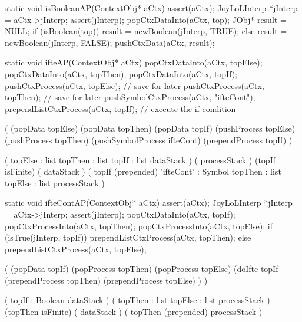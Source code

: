 \startCCode
static void isBooleanAP(ContextObj* aCtx) {
  assert(aCtx);
  JoyLoLInterp *jInterp = aCtx->jInterp;
  assert(jInterp);
  popCtxDataInto(aCtx, top);
  JObj* result = NULL;
  if (isBoolean(top))
    result = newBoolean(jInterp, TRUE);
  else
    result = newBoolean(jInterp, FALSE);
  pushCtxData(aCtx, result);
}
\stopCCode

\stopJoyLoLWord

\startJoyLoLWord[ifte]

\startCCode
static void ifteAP(ContextObj* aCtx) {
  popCtxDataInto(aCtx, topElse);
  popCtxDataInto(aCtx, topThen);
  popCtxDataInto(aCtx, topIf);
  pushCtxProcess(aCtx, topElse); // save for later
  pushCtxProcess(aCtx, topThen); // save for later
  pushSymbolCtxProcess(aCtx, "ifteCont");
  prependListCtxProcess(aCtx, topIf); // execute the if condition
}
\stopCCode

\startImplementation[ansiC]
  (
    (popData topElse)
    (popData topThen)
    (popData topIf)
    (pushProcess topElse)
    (pushProcess topThen)
    (pushSymbolProcess ifteCont)
    (prependProcess topIf)
  )
\stopImplementation

\startRule[ifte]
\preDataStack
  (
    topElse : list
    topThen : list
    topIf   : list
    dataStack
  )
\preProcessStack
  (
    processStack
  )
\preConditions
  (topIf isFinite)
\postDataStack
  (
    dataStack
  )
\postProcessStack
  (
    topIf (prepended)
    'ifteCont' : Symbol
    topThen    : list
    topElse    : list
    processStack
  )
\postConditions
\stopRule

\stopJoyLoLWord

\startJoyLoLWord[ifteCont]

\startCCode
static void ifteContAP(ContextObj* aCtx) {
  assert(aCtx);
  JoyLoLInterp *jInterp = aCtx->jInterp;
  assert(jInterp);
  popCtxDataInto(aCtx, topIf);
  popCtxProcessInto(aCtx, topThen);
  popCtxProcessInto(aCtx, topElse);
  if (isTrue(jInterp, topIf)) {
    prependListCtxProcess(aCtx, topThen);
  } else {
    prependListCtxProcess(aCtx, topElse);
  }
}
\stopCCode

\startImplementation[ansiC]
  (
    (popData topIf)
    (popProcess topThen)
    (popProcess topElse)
    (doIfte topIf 
      (prependProcess topThen)
      (prependProcess topElse)
    )
  )
\stopImplementation

\preDataStack
  (
    topIf : Boolean
    dataStack
  )
\preProcessStack
  (
    topThen : list
    topElse : list
    processStack
  )
\preConditions
  (topThen isFinite)
\postDataStack
  (
    dataStack
  )
\postProcessStack
  (
    topThen (prepended)
    processStack
  )
\postConditions
\stopRule

